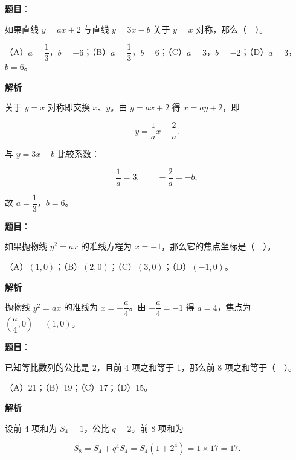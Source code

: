 \begin{answer}

\textbf{题目}：

如果直线 $y=ax+2$ 与直线 $y=3x-b$ 关于 $y=x$ 对称，那么（　）。

（A）$a=\dfrac13$，$b=-6$；（B）$a=\dfrac13$，$b=6$；（C）$a=3$，$b=-2$；（D）$a=3$，$b=6$。

\textbf{解析}

关于 $y=x$ 对称即交换 $x$、$y$。由 $y=ax+2$ 得 $x=ay+2$，即

\nopagebreak[4]
\[
y=\frac1a x-\frac2a.
\]

与 $y=3x-b$ 比较系数：

\nopagebreak[4]
\[
\frac1a=3,\qquad -\frac2a=-b,
\]

故 $a=\dfrac13$，$b=6$。


\end{answer}
\begin{answer}

\textbf{题目}：

如果抛物线 $y^2=ax$ 的准线方程为 $x=-1$，那么它的焦点坐标是（　）。

（A）$(1,0)$；（B）$(2,0)$；（C）$(3,0)$；（D）$(-1,0)$。

\textbf{解析}

抛物线 $y^2=ax$ 的准线为 $x=-\dfrac{a}{4}$。由 $-\dfrac{a}{4}=-1$ 得 $a=4$，焦点为 $\left(\dfrac{a}{4},0\right)=(1,0)$。


\end{answer}
\begin{answer}

\textbf{题目}：

已知等比数列的公比是 2，且前 4 项之和等于 1，那么前 8 项之和等于（　）。

（A）21；（B）19；（C）17；（D）15。

\textbf{解析}

设前 4 项和为 $S_4=1$，公比 $q=2$。前 8 项和为

\nopagebreak[4]
\[
S_8=S_4+q^4S_4=S_4(1+2^4)=1\times17=17.
\]


\end{answer}
